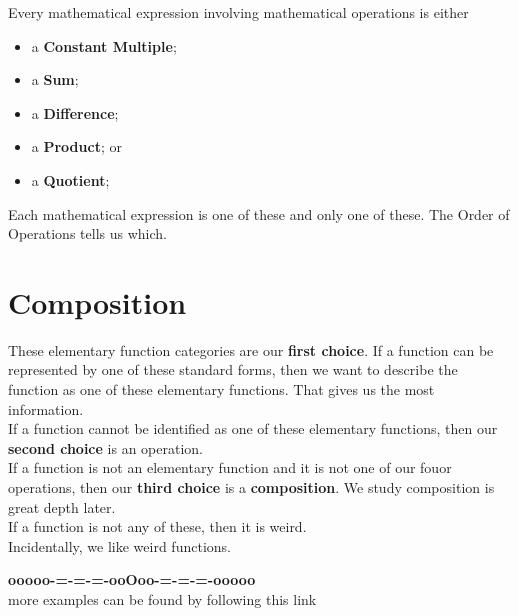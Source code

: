 \documentclass{ximera}
\begin{document}
Every mathematical expression involving mathematical operations is either

\begin{itemize}
	\item a \textbf{Constant Multiple};
	\item a \textbf{Sum};
	\item a \textbf{Difference};
	\item a \textbf{Product}; or 
	\item a \textbf{Quotient};
\end{itemize}



Each mathematical expression is one of these and only one of these.  The Order of Operations tells us which.













\section*{Composition}


These elementary function categories are our \textbf{first choice}.  If a function can be represented by one of these standard forms, then we want to describe the function as one of these elementary functions.  That gives us the most information. \\


If a function cannot be identified as one of these elementary functions, then our \textbf{second choice} is an operation. \\


If a function is not an elementary function and it is not one of our fouor operations, then our \textbf{third choice} is a \textbf{\textcolor{purple!85!blue}{composition}}.  We study composition is great depth later. \\


If a function is not any of these, then it is weird. \\

Incidentally, we like weird functions.



















\begin{center}
\textbf{\textcolor{green!50!black}{ooooo-=-=-=-ooOoo-=-=-=-ooooo}} \\

more examples can be found by following this link\\ 

\end{center}
\end{document}
